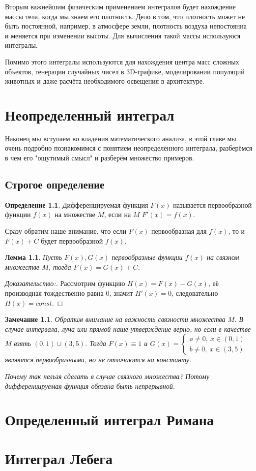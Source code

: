 \documentclass{book} %
\newtheorem{lemma}{Лемма}[chapter] %
\newtheorem{notabene}{Замечание}[chapter]
\theoremstyle{definition}
\newtheorem{definition}{Определение}[chapter]
\theoremstyle{remark}
\begin{document}
		Вторым важнейшим физическим применением интегралов будет нахождение массы тела, когда мы знаем его плотность. Дело в том, что плотность может не быть постоянной, например, в атмосфере земли, плотность воздуха непостоянна и меняется при изменении высоты. Для вычисления такой массы используюся интегралы.
		
		Помимо этого интегралы используются для нахождения центра масс сложных объектов, генерации случайных чисел в 3D-графике, моделировании популяций животных и даже расчёта необходимого освещения в архитектуре.
		
	\chapter{Неопределенный интеграл}
		Наконец мы вступаем во владения математического анализа, в этой главе мы очень подробно познакомимся с понятием неопределённого интеграла, разберёмся в чем его "ощутимый смысл" и разберём множество примеров.
	\section{Строгое определение}
		\begin{definition}
			Дифференцируемая функция $F(x)$ называется первообразной функции $f(x)$ на множестве $M$, если на $M$ $F'(x) = f(x)$.
		\end{definition}
		Сразу обратим наше внимание, что если $F(x)$ первообразная для $f(x)$, то и $F(x) + C$ будет первообразной $f(x)$.
		\begin{lemma}
			Пусть $F(x), G(x)$ первообразные функции $f(x)$ на связном множестве $M$, тогда $F(x) = G(x) + C$.
		\end{lemma}
		\begin{proof}[Доказательство:]
			Рассмотрим функцию $H(x) = F(x) - G(x)$, её производная тождественно равна 0, значит $H'(x) = 0$, следовательно $H(x) = const$.
		\end{proof}
		\begin{notabene}
			Обратим внимание на важность связности множества $M$. В случае интервала, луча или прямой наше утверждение верно, но если в качестве $M$ взять $(0,1) \cup (3,5)$. Тогда $F(x) \equiv 1$ и $G(x) = \begin{cases} a\neq0,\ x \in (0,1) \\ b\neq 0, \ x \in (3,5) \end{cases}$ являются первообразными, но не отличаются на константу.
			
			Почему так нельзя сделать в случае связного множества? Потому дифференцируемая функция обязана быть непрерывной.
		\end{notabene}
		
		
		
	\chapter{Определенный интеграл Римана}
		
	\chapter{Интеграл Лебега}
	
	
\end{document}
